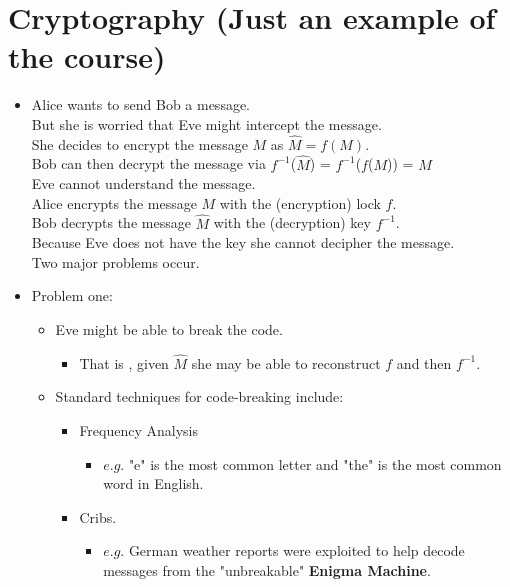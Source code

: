 \documentclass[12pt]{article}
\begin{document}
\section{Cryptography (Just an example of the course)}
\renewcommand{\labelitemii}{$\circ$}
\renewcommand{\labelitemiii}{$\cdot$}
\renewcommand{\labelitemiii}{$\rightarrow$}
\renewcommand{\labelitemiv}{$\star$}
\begin{itemize}
\item Alice wants to send Bob a message.\\
\noindent But she is worried that Eve might intercept the message.\\
\noindent She decides to encrypt the message $M$ as $\hat{M} = f(M)$.\\
\noindent Bob can then decrypt the message via $f^{-1}$($\hat{M}$) = $f^{-1}$($f$($M$)) = $M$\\
\noindent Eve cannot understand the message.\\
\noindent Alice encrypts the message $M$ with the (encryption) lock $f$.\\
\noindent Bob decrypts the message $\hat{M}$ with the (decryption) key $f^{-1}$.\\
\noindent Because Eve does not have the key she cannot decipher the message.\\
\noindent Two major problems occur.
\item Problem one:
	\begin{itemize}
	\item Eve might be able to break the code.
		\begin{itemize}
		\item That is , given $\hat{M}$ she may be able to reconstruct $f$ and then $f^{-1}$.
		\end{itemize}
	\item Standard techniques for code-breaking include:
		\begin{itemize}
		\item Frequency Analysis
			\begin{itemize}
			\item $e.g.$ "e" is the most common letter and "the" is the most common word in 					English.
			\end{itemize}
		\item Cribs. 
			\begin{itemize}
			\item $e.g.$ German weather reports were exploited to help decode messages 						from 	the "unbreakable" \textbf{Enigma Machine}.
			\end{itemize}
		\end{itemize}
	\end{itemize}


\end{itemize}
\end{document}
